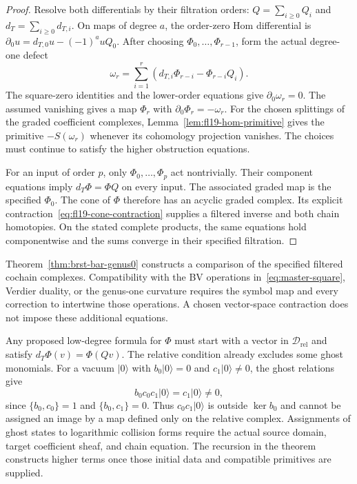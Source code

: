 \begin{proof}
Resolve both differentials by their filtration orders:
$Q=\sum_{i\ge0}Q_i$ and $d_T=\sum_{i\ge0}d_{T,i}$.
On maps of degree $a$, the order-zero Hom differential is
$\partial_0u=d_{T,0}u-(-1)^a uQ_0$.
After choosing $\Phi_0,\ldots,\Phi_{r-1}$, form the actual degree-one defect
\[
\omega_r=\sum_{i=1}^{r}
(d_{T,i}\Phi_{r-i}-\Phi_{r-i}Q_i).
\]
The square-zero identities and the lower-order equations give $\partial_0\omega_r=0$.
The assumed vanishing gives a map $\Phi_r$ with $\partial_0\Phi_r=-\omega_r$.
For the chosen splittings of the graded coefficient complexes, Lemma~\ref{lem:fl19-hom-primitive} gives the primitive $-S(\omega_r)$ whenever its cohomology projection vanishes.
The choices must continue to satisfy the higher obstruction equations.

For an input of order $p$, only $\Phi_0,\ldots,\Phi_p$ act nontrivially.
Their component equations imply $d_T\Phi=\Phi Q$ on every input.
The associated graded map is the specified $\Phi_0$.
The cone of $\Phi$ therefore has an acyclic graded complex.
Its explicit contraction~\eqref{eq:fl19-cone-contraction} supplies a filtered inverse and both chain homotopies.
On the stated complete products, the same equations hold componentwise and the sums converge in their specified filtration.
\end{proof}

\begin{remark}
\label{rem:bv-convergence}
Theorem~\ref{thm:brst-bar-genus0} constructs a comparison of the specified filtered cochain complexes.
Compatibility with the BV operations in~\eqref{eq:master-square}, Verdier duality, or the genus-one curvature requires the symbol map and every correction to intertwine those operations.
A chosen vector-space contraction does not impose these additional equations.
\end{remark}

\begin{remark}
\label{rem:brst-bar-explicit}
Any proposed low-degree formula for $\Phi$ must start with a vector in $\mathcal D_{\mathrm{rel}}$ and satisfy $d_T\Phi(v)=\Phi(Qv)$.
The relative condition already excludes some ghost monomials.
For a vacuum $|0\rangle$ with $b_0|0\rangle=0$ and $c_1|0\rangle\ne0$, the ghost relations give
\[
 b_0c_0c_1|0\rangle=c_1|0\rangle\ne0,
\]
since $\{b_0,c_0\}=1$ and $\{b_0,c_1\}=0$.
Thus $c_0c_1|0\rangle$ is outside $\ker b_0$ and cannot be assigned an image by a map defined only on the relative complex.
Assignments of ghost states to logarithmic collision forms require the actual source domain, target coefficient sheaf, and chain equation.
The recursion in the theorem constructs higher terms once those initial data and compatible primitives are supplied.
\end{remark}

